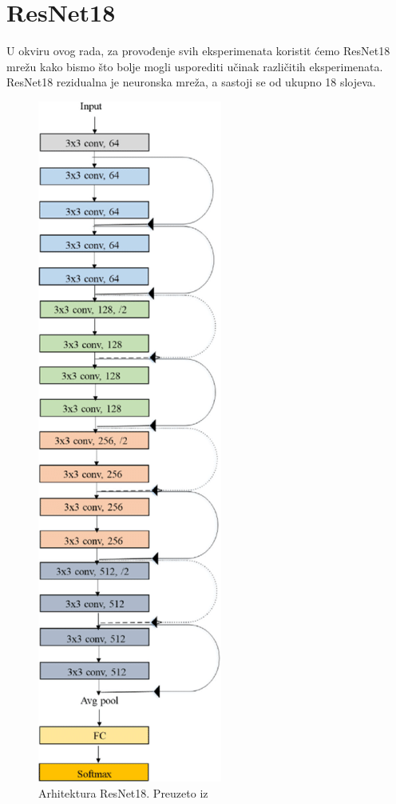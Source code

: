 \documentclass[times, utf8, zavrsni, numeric]{fer}
\begin{document}
\section{ResNet18}

U okviru ovog rada, za provođenje svih eksperimenata koristit ćemo ResNet18 mrežu kako bismo što bolje mogli usporediti učinak različitih eksperimenata. 
ResNet18 rezidualna je neuronska mreža, a sastoji se od ukupno 18 slojeva. 

\begin{figure}[htb]
    \centering
    \includegraphics[scale=0.7]{resnet18.png}
    \caption{Arhitektura ResNet18. Preuzeto iz \cite{mcc19}}
    \label{fig:resnet18}
\end{figure}
\end{document}
